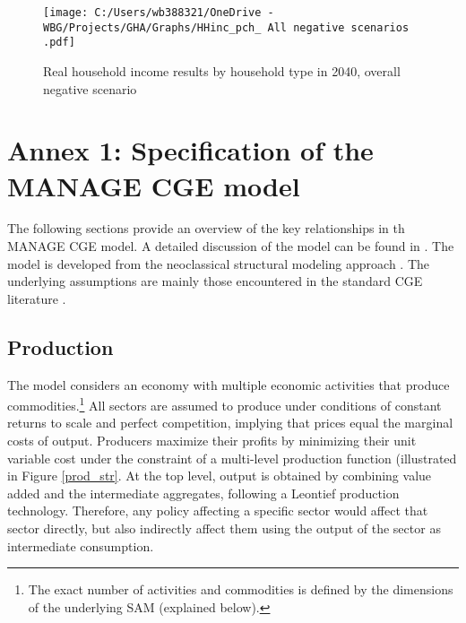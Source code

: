 \documentclass[11pt,english]{article}
\begin{document}
\begin{figure}[ht!]\caption{Real household income results by household type in 2040, overall negative scenario} \label{fig_HHInc_pch_All_neg}
	\centering
	\texttt{[image: C:/Users/wb388321/OneDrive - WBG/Projects/GHA/Graphs/HHinc\_pch\_ All negative scenarios .pdf]}
\end{figure}




\clearpage
% 
 



\clearpage

\appendix

\section{Annex 1: Specification of the MANAGE CGE model}

The following sections provide an overview of the key relationships in th MANAGE CGE model. A detailed discussion of the model can be found in \citet{vdMensbrugghe_2017} . The model is developed from the neoclassical structural modeling approach \citep[cf.][]{Dervis_etal_1982}. The underlying assumptions are mainly those encountered in the standard CGE literature \citep{deMelo_Tarr_1992, Dixon_Jorgenson_2013}. 

\subsection{Production}

The model considers an economy with multiple economic activities that produce commodities.\footnote{The exact number of activities and commodities is defined by the dimensions of the underlying SAM (explained below).} All sectors are assumed to produce under conditions of constant returns to scale and perfect competition, implying that prices equal the marginal costs of output. Producers maximize their profits by minimizing their unit variable cost under the constraint of a multi-level production function (illustrated in Figure \ref{prod_str}. At the top level, output is obtained by combining value added and the intermediate aggregates, following a Leontief production technology. Therefore, any policy affecting a specific sector would affect that sector directly, but also indirectly affect them using the output of the sector as intermediate consumption. 
\end{document}
